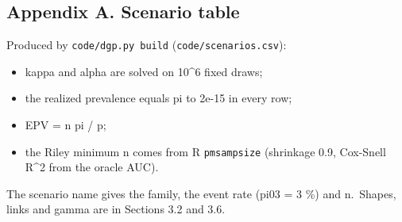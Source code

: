 \documentclass[
  10pt,
]{article}
\providecommand{\tightlist}{%
  \setlength{\itemsep}{0pt}\setlength{\parskip}{0pt}}
\begin{document}
\subsection{Appendix A. Scenario
table}\label{appendix-a.-scenario-table}

Produced by \texttt{code/dgp.py\ build}
(\texttt{code/scenarios.csv}):

\begin{itemize}
\tightlist
\item
  kappa and alpha are solved on 10\^{}6 fixed draws;
\item
  the realized prevalence equals pi to 2e-15 in every row;
\item
  EPV = n pi / p;
\item
  the Riley minimum n comes from R \texttt{pmsampsize}
  (shrinkage 0.9, Cox-Snell R\^{}2 from the oracle AUC).
\end{itemize}

The scenario name gives the family, the event rate (pi03 = 3
\%) and n.~Shapes, links and gamma are in Sections 3.2 and
3.6.
\end{document}
